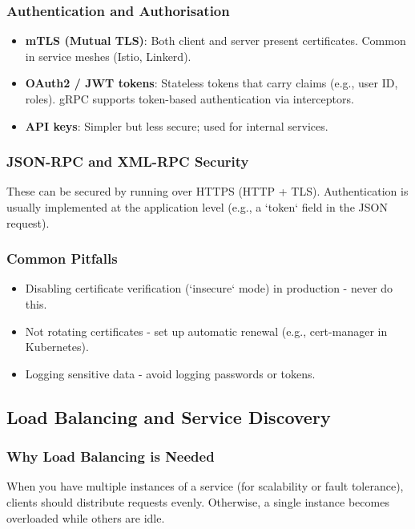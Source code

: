\documentclass[10pt,a4paper]{article}
\begin{document}
\subsubsection{Authentication and Authorisation}
\begin{itemize}
    \item \textbf{mTLS (Mutual TLS)}: Both client and server present certificates. Common in service meshes (Istio, Linkerd).
    \item \textbf{OAuth2 / JWT tokens}: Stateless tokens that carry claims (e.g., user ID, roles). gRPC supports token-based authentication via interceptors.
    \item \textbf{API keys}: Simpler but less secure; used for internal services.
\end{itemize}

\subsubsection{JSON-RPC and XML-RPC Security}
These can be secured by running over HTTPS (HTTP + TLS). Authentication is usually implemented at the application level (e.g., a `token` field in the JSON request).

\subsubsection{Common Pitfalls}
\begin{itemize}
    \item Disabling certificate verification (`insecure` mode) in production - never do this.
    \item Not rotating certificates - set up automatic renewal (e.g., cert-manager in Kubernetes).
    \item Logging sensitive data - avoid logging passwords or tokens.
\end{itemize}

\subsection{Load Balancing and Service Discovery}

\subsubsection{Why Load Balancing is Needed}
When you have multiple instances of a service (for scalability or fault tolerance), clients should distribute requests evenly. Otherwise, a single instance becomes overloaded while others are idle.
\end{document}

